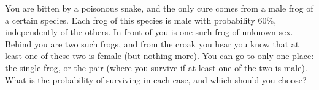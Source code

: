 You are bitten by a poisonous snake, and the only cure comes from a male frog of a certain species. Each frog of this species is male with probability $60\%$, independently of the others. In front of you is one such frog of unknown sex. Behind you are two such frogs, and from the croak you hear you know that at least one of these two is female (but nothing more). You can go to only one place: the single frog, or the pair (where you survive if at least one of the two is male). What is the probability of surviving in each case, and which should you choose?
